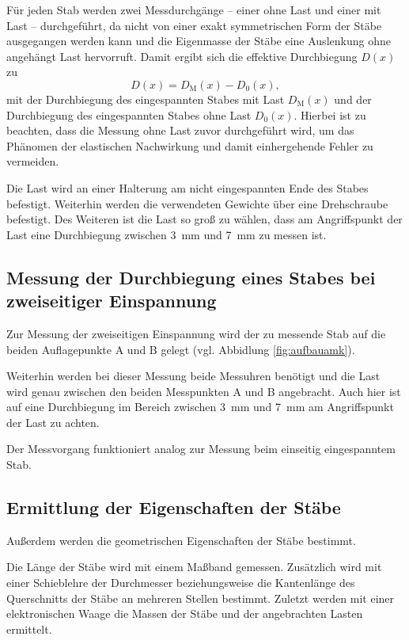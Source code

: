 Für jeden Stab werden zwei Messdurchgänge -- einer ohne Last und einer mit Last -- durchgeführt,
da nicht von einer exakt symmetrischen Form der Stäbe ausgegangen werden kann und die Eigenmasse
der Stäbe eine Auslenkung ohne angehängt Last hervorruft.
Damit ergibt sich die effektive Durchbiegung $D(x)$ zu
\begin{equation}
	D(x) = D_{\mathrm{M}}(x) - D_0(x) \mathrm{,}
\end{equation}
mit der Durchbiegung des eingespannten Stabes mit Last $D_{\mathrm{M}}(x)$ und der Durchbiegung
des eingespannten Stabes ohne Last $D_0(x)$.
Hierbei ist zu beachten, dass die Messung ohne Last zuvor durchgeführt wird, um das Phänomen
der elastischen Nachwirkung \cite{V102} und damit einhergehende Fehler zu vermeiden.

Die Last wird an einer Halterung am nicht eingespannten Ende des Stabes befestigt. Weiterhin
werden die verwendeten Gewichte über eine Drehschraube befestigt.
Des Weiteren ist die Last so groß zu wählen, dass am Angriffspunkt der Last eine Durchbiegung
zwischen \SI{3}{\milli\meter} und \SI{7}{\milli\meter} zu messen ist.

\subsection{Messung der Durchbiegung eines Stabes bei zweiseitiger Einspannung}
Zur Messung der zweiseitigen Einspannung wird der zu messende Stab auf die beiden Auflagepunkte
A und B gelegt (vgl. Abbidlung \ref{fig:aufbauamk}).

Weiterhin werden bei dieser Messung beide Messuhren benötigt und die Last wird genau zwischen
den beiden Messpunkten A und B angebracht. Auch hier ist auf eine Durchbiegung im Bereich
zwischen \SI{3}{\milli\meter} und \SI{7}{\milli\meter} am Angriffspunkt der Last zu achten.

Der Messvorgang funktioniert analog zur Messung beim einseitig eingespanntem Stab.

\subsection{Ermittlung der Eigenschaften der Stäbe}
Außerdem werden die geometrischen Eigenschaften der Stäbe bestimmt.

Die Länge der Stäbe wird mit einem Maßband gemessen.
Zusätzlich wird mit einer Schieblehre %
der Durchmesser beziehungsweise die Kantenlänge des Querschnitts der Stäbe an mehreren Stellen bestimmt.
Zuletzt werden mit einer elektronischen Waage die Massen der Stäbe und der angebrachten
Lasten ermittelt.
